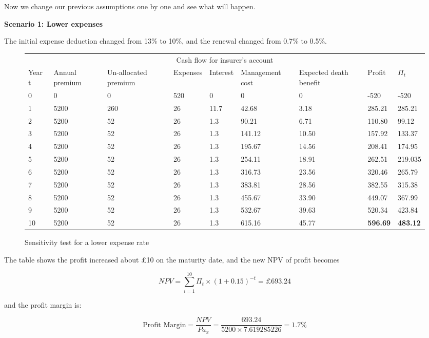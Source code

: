 \documentclass{report}
\begin{document}
Now we change our previous assumptions one by one and see what will happen.

\textbf{Scenario 1: Lower expenses} 

The initial expense deduction changed from 13\% to 10\%, and the renewal changed from 0.7\% to 0.5\%.




\begin{figure}[H]
\hfill
    \centering
\begin{tabular}{p{0.8cm} p{1.5cm} p{1.5cm} p{1.2cm} p{1cm} p{2cm}p{1.5cm} p{1.5cm} p{1.5cm} }
\toprule
\multicolumn{9}{c}{Cash flow for insurer's account} \\
\cmidrule(r){3-7}

Year t & Annual premium & Un-allocated premium & Expenses & Interest &Management cost& Expected death benefit & Profit& $\Pi_t$  \\
\midrule

0&0&0&520&0&0&0&-520&-520\\
1&5200&260&26&11.7&42.68&3.18&285.21&285.21\\
2&5200&52&26&1.3&90.21&6.71&110.80&99.12\\
3&5200&52&26&1.3&141.12&10.50&157.92&133.37\\
4&5200&52&26&1.3&195.67&14.56&208.41&174.95\\
5&5200&52&26&1.3&254.11&18.91&262.51&219.035\\
6&5200&52&26&1.3&316.73&23.56&320.46&265.79\\
7&5200&52&26&1.3&383.81&28.56&382.55&315.38\\
8&5200&52&26&1.3&455.67&33.90&449.07&367.99\\
9&5200&52&26&1.3&532.67&39.63&520.34&423.84\\
10&5200&52&26&1.3&615.16&45.77&\textbf{596.69}&\textbf{483.12}\\

\bottomrule
\end{tabular}
\caption{Sensitivity test for a lower expense rate}
\label{determ-sensi-expense}
\end{figure}

The table shows the profit increased about \pounds 10 on the maturity date, and the new NPV of profit becomes 

\[
 NPV=\sum_{i=1}^{10} \Pi_t \times (1+0.15)^{-t} = \pounds693.24 
\]
 
and the profit margin is:

\[
\text{Profit Margin} =  \frac{NPV}{P \ddot{a}_x}= \frac{693.24 }{5200 \times 7.619285226} = 1.7\%
\]
\end{document}
